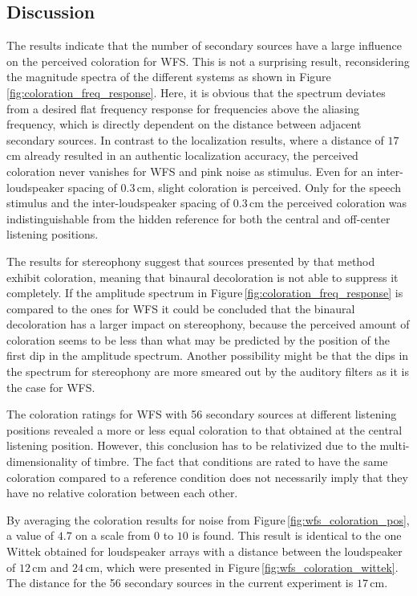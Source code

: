 \subsection{Discussion}
\label{sec:wfs_coloration_discussion}
%
The results indicate that the number of secondary sources have a large influence
on the perceived coloration for \ac{WFS}. This is not a surprising result,
reconsidering the magnitude spectra of the different systems as shown in
Figure\,\ref{fig:coloration_freq_response}. Here, it is obvious that the spectrum
deviates from a desired flat frequency response for frequencies above the aliasing
frequency, which is directly dependent on the distance between adjacent secondary
sources.
In contrast to the localization results, where a distance of $17$\,cm already resulted
in an authentic localization accuracy, the perceived coloration never
vanishes for \ac{WFS} and pink noise as stimulus. Even for an inter-loudspeaker
spacing of $0.3$\,cm, slight coloration is perceived. 
Only for the speech stimulus and the inter-loudspeaker spacing of $0.3$\,cm the perceived
coloration was indistinguishable from the hidden reference for both the central
and off-center listening positions.

The results for stereophony suggest that sources presented by that method
exhibit coloration, meaning that binaural decoloration is not able to suppress
it completely. If the amplitude spectrum in
Figure\,\ref{fig:coloration_freq_response} is compared to the ones for \ac{WFS} it
could be concluded that the binaural decoloration has a larger impact on
stereophony, because the perceived amount of coloration seems to be less than
what may be predicted by the position of the first dip in the amplitude
spectrum.
Another possibility might be that the dips in the spectrum for stereophony are
more smeared out by the auditory filters as it is the case for \ac{WFS}.

The coloration ratings for \ac{WFS} with 56 secondary sources at
different listening positions revealed a more or less equal coloration to 
that obtained at the central listening position. However, this conclusion has to
be relativized due to the multi-dimensionality of timbre. The fact that conditions
are rated to have the same coloration compared to a reference condition does not
necessarily imply that they have no relative coloration between each other.

By averaging the coloration results for noise from
Figure\,\ref{fig:wfs_coloration_pos}, a value of $4.7$
on a scale from $0$ to $10$ is found.
This result is identical to the one Wittek\autocite{Wittek2007} obtained
for loudspeaker arrays with a distance between the loudspeaker of $12$\,cm and
$24$\,cm, which were presented in Figure\,\ref{fig:wfs_coloration_wittek}.
The distance for the 56 secondary sources in the current experiment is
$17$\,cm.

